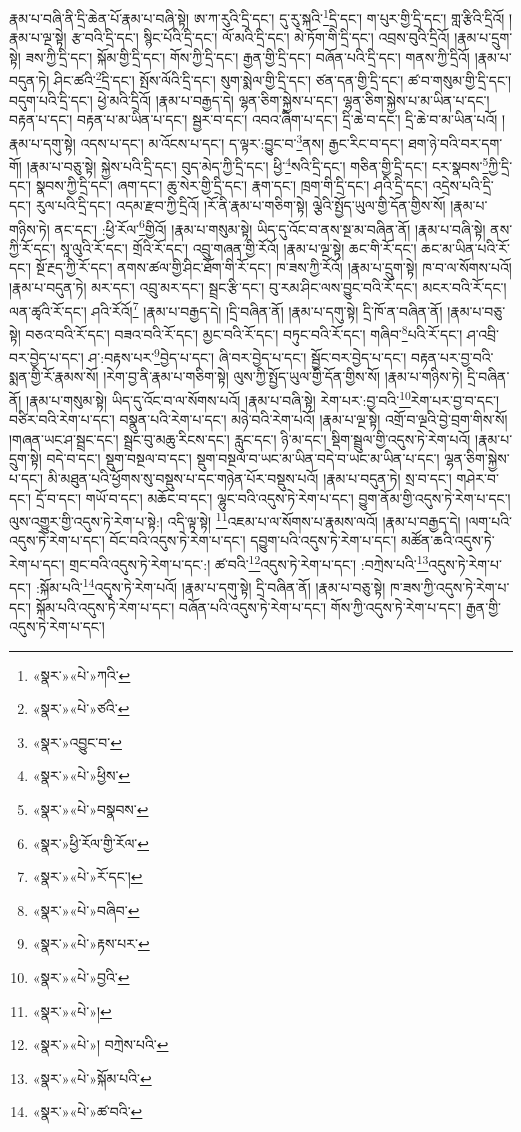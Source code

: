 རྣམ་པ་བཞི་ནི་དྲི་ཆེན་པོ་རྣམ་པ་བཞི་སྟེ། ཨ་ཀ་རུའི་དྲི་དང་། དུ་རུ་སྐའི་\footnote{«སྣར་»«པེ་»ཀའི་}དྲི་དང་། ག་པུར་གྱི་དྲི་དང་། གླ་རྩིའི་དྲིའོ། །རྣམ་པ་ལྔ་སྟེ། རྩ་བའི་དྲི་དང་། སྙིང་པོའི་དྲི་དང་། ལོ་མའི་དྲི་དང་། མེ་ཏོག་གི་དྲི་དང་། འབྲས་བུའི་དྲིའོ། །རྣམ་པ་དྲུག་སྟེ། ཟས་ཀྱི་དྲི་དང་། སྐོམ་གྱི་དྲི་དང་། གོས་ཀྱི་དྲི་དང་། རྒྱན་གྱི་དྲི་དང་། བཞོན་པའི་དྲི་དང་། གནས་ཀྱི་དྲིའོ། །རྣམ་པ་བདུན་ཏེ། ཤིང་ཚའི་\footnote{«སྣར་»«པེ་»ཙའི་}དྲི་དང་། སྤོས་ལོའི་དྲི་དང་། སུག་སྨེལ་གྱི་དྲི་དང་། ཙན་དན་གྱི་དྲི་དང་། ཚ་བ་གསུམ་གྱི་དྲི་དང་། བདུག་པའི་དྲི་དང་། ཕྱེ་མའི་དྲིའོ། །རྣམ་པ་བརྒྱད་དེ། ལྷན་ཅིག་སྐྱེས་པ་དང་། ལྷན་ཅིག་སྐྱེས་པ་མ་ཡིན་པ་དང་། བརྟན་པ་དང་། བརྟན་པ་མ་ཡིན་པ་དང་། སྦྱར་བ་དང་། འབའ་ཞིག་པ་དང་། དྲི་ཆེ་བ་དང་། དྲི་ཆེ་བ་མ་ཡིན་པའོ། །རྣམ་པ་དགུ་སྟེ། འདས་པ་དང་། མ་འོངས་པ་དང་། ད་ལྟར་:བྱུང་བ་\footnote{«སྣར་»འབྱུང་བ་}ནས། རྒྱང་རིང་བ་དང་། ཐག་ཉེ་བའི་བར་དག་གོ། །རྣམ་པ་བཅུ་སྟེ། སྐྱེས་པའི་དྲི་དང་། བུད་མེད་ཀྱི་དྲི་དང་། ཕྱི་\footnote{«སྣར་»«པེ་»ཕྱིས་}སའི་དྲི་དང་། གཅིན་གྱི་དྲི་དང་། ངར་སྣབས་\footnote{«སྣར་»«པེ་»བསྣབས་}ཀྱི་དྲི་དང་། སྣབས་ཀྱི་དྲི་དང་། ཞག་དང་། ཆུ་སེར་གྱི་དྲི་དང་། རྣག་དང་། ཁྲག་གི་དྲི་དང་། ཤའི་དྲི་དང་། འདྲེས་པའི་དྲི་དང་། རུལ་པའི་དྲི་དང་། འདམ་རྫབ་ཀྱི་དྲིའོ། །རོ་ནི་རྣམ་པ་གཅིག་སྟེ། ལྕེའི་སྤྱོད་ཡུལ་གྱི་དོན་གྱིས་སོ། །རྣམ་པ་གཉིས་ཏེ། ནང་དང་། :ཕྱི་རོལ་\footnote{«སྣར་»ཕྱི་རོལ་གྱི་རོལ་}གྱིའོ། །རྣམ་པ་གསུམ་སྟེ། ཡིད་དུ་འོང་བ་ནས་སྔ་མ་བཞིན་ནོ། །རྣམ་པ་བཞི་སྟེ། ནས་ཀྱི་རོ་དང་། སཱ་ལུའི་རོ་དང་། གྲོའི་རོ་དང་། འབྲུ་གཞན་གྱི་རོའོ། །རྣམ་པ་ལྔ་སྟེ། ཆང་གི་རོ་དང་། ཆང་མ་ཡིན་པའི་རོ་དང་། སྔོ་རྔད་ཀྱི་རོ་དང་། ནགས་ཚལ་གྱི་ཤིང་ཐོག་གི་རོ་དང་། ཁ་ཟས་ཀྱི་རོའོ། །རྣམ་པ་དྲུག་སྟེ། ཁ་བ་ལ་སོགས་པའོ། །རྣམ་པ་བདུན་ཏེ། མར་དང་། འབྲུ་མར་དང་། སྦྲང་རྩི་དང་། བུ་རམ་ཤིང་ལས་བྱུང་བའི་རོ་དང་། མངར་བའི་རོ་དང་། ལན་ཚྭའི་རོ་དང་། ཤའི་རོའོ།\footnote{«སྣར་»«པེ་»རོ་དང་།} །རྣམ་པ་བརྒྱད་དེ། །དྲི་བཞིན་ནོ། །རྣམ་པ་དགུ་སྟེ། དྲི་ཁོ་ན་བཞིན་ནོ། །རྣམ་པ་བཅུ་སྟེ། བཅའ་བའི་རོ་དང་། བཟའ་བའི་རོ་དང་། མྱང་བའི་རོ་དང་། བཏུང་བའི་རོ་དང་། གཞིབ་\footnote{«སྣར་»«པེ་»བཞིབ་}པའི་རོ་དང་། ཤ་འབྲི་བར་བྱེད་པ་དང་། ཤ་:བརྟས་པར་\footnote{«སྣར་»«པེ་»རྟས་པར་}བྱེད་པ་དང་། ཞི་བར་བྱེད་པ་དང་། སྦྱོང་བར་བྱེད་པ་དང་། བརྟན་པར་བྱ་བའི་སྨན་གྱི་རོ་རྣམས་སོ། །རེག་བྱ་ནི་རྣམ་པ་གཅིག་སྟེ། ལུས་ཀྱི་སྤྱོད་ཡུལ་གྱི་དོན་གྱིས་སོ། །རྣམ་པ་གཉིས་ཏེ། དྲི་བཞིན་ནོ། །རྣམ་པ་གསུམ་སྟེ། ཡིད་དུ་འོང་བ་ལ་སོགས་པའོ། །རྣམ་པ་བཞི་སྟེ། རེག་པར་:བྱ་བའི་\footnote{«སྣར་»«པེ་»བྱའི་}རེག་པར་བྱ་བ་དང་། བཙིར་བའི་རེག་པ་དང་། བསྣུན་པའི་རེག་པ་དང་། མཉེ་བའི་རེག་པའོ། །རྣམ་པ་ལྔ་སྟེ། འགྲོ་བ་ལྔའི་བྱེ་བྲག་གིས་སོ། །གཞན་ཡང་ཤ་སྦྲང་དང་། སྦྲང་བུ་མཆུ་རིངས་དང་། རླུང་དང་། ཉི་མ་དང་། སྡིག་སྦྲུལ་གྱི་འདུས་ཏེ་རེག་པའོ། །རྣམ་པ་དྲུག་སྟེ། བདེ་བ་དང་། སྡུག་བསྔལ་བ་དང་། སྡུག་བསྔལ་བ་ཡང་མ་ཡིན་བདེ་བ་ཡང་མ་ཡིན་པ་དང་། ལྷན་ཅིག་སྐྱེས་པ་དང་། མི་མཐུན་པའི་ཕྱོགས་སུ་བསྡུས་པ་དང་གཉེན་པོར་བསྡུས་པའོ། །རྣམ་པ་བདུན་ཏེ། སྲ་བ་དང་། གཤེར་བ་དང་། དྲོ་བ་དང་། གཡོ་བ་དང་། མཆོང་བ་དང་། ལྷུང་བའི་འདུས་ཏེ་རེག་པ་དང་། བྱུག་ནོམ་གྱི་འདུས་ཏེ་རེག་པ་དང་། ལུས་འགྱུར་གྱི་འདུས་ཏེ་རེག་པ་སྟེ:། འདི་ལྟ་སྟེ། \footnote{«སྣར་»«པེ་»།  }འཇམ་པ་ལ་སོགས་པ་རྣམས་ལའོ། །རྣམ་པ་བརྒྱད་དེ། །ལག་པའི་འདུས་ཏེ་རེག་པ་དང་། བོང་བའི་འདུས་ཏེ་རེག་པ་དང་། དབྱུག་པའི་འདུས་ཏེ་རེག་པ་དང་། མཚོན་ཆའི་འདུས་ཏེ་རེག་པ་དང་། གྲང་བའི་འདུས་ཏེ་རེག་པ་དང་:། ཚ་བའི་\footnote{«སྣར་»«པེ་»།  བཀྲེས་པའི་}འདུས་ཏེ་རེག་པ་དང་། :བཀྲེས་པའི་\footnote{«སྣར་»«པེ་»སྐོམ་པའི་}འདུས་ཏེ་རེག་པ་དང་། :སྐོམ་པའི་\footnote{«སྣར་»«པེ་»ཚ་བའི་}འདུས་ཏེ་རེག་པའོ། །རྣམ་པ་དགུ་སྟེ། དྲི་བཞིན་ནོ། །རྣམ་པ་བཅུ་སྟེ། ཁ་ཟས་ཀྱི་འདུས་ཏེ་རེག་པ་དང་། སྐོམ་པའི་འདུས་ཏེ་རེག་པ་དང་། བཞོན་པའི་འདུས་ཏེ་རེག་པ་དང་། གོས་ཀྱི་འདུས་ཏེ་རེག་པ་དང་། རྒྱན་གྱི་འདུས་ཏེ་རེག་པ་དང་། 